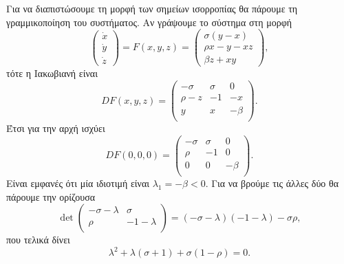 \begin{solution}
    Για να διαπιστώσουμε τη μορφή των σημείων ισορροπίας θα πάρουμε τη
    γραμμικοποίηση του συστήματος. Αν γράψουμε το σύστημα στη μορφή
    \begin{equation*}
        \begin{pmatrix}
            \dot{x} \\
            \dot{y} \\
            \dot{z}
        \end{pmatrix} = F(x, y, z) =
        \begin{pmatrix}
            \sigma(y - x) \\
            \rho x - y - xz \\
            \beta z + xy
        \end{pmatrix},
    \end{equation*}
    τότε η Ιακωβιανή είναι
    \begin{equation*}
        DF(x, y, z) =
        \begin{pmatrix}
            -\sigma & \sigma & 0 \\
            \rho - z & -1 & -x \\
            y & x & -\beta \\
        \end{pmatrix}.
    \end{equation*}
    Έτσι για την αρχή ισχύει
    \begin{equation*}
        DF(0, 0, 0) =
        \begin{pmatrix}
            -\sigma & \sigma & 0 \\
            \rho & -1 & 0 \\
            0 & 0 & -\beta \\
        \end{pmatrix}.
    \end{equation*}
    Είναι εμφανές ότι μία ιδιοτιμή είναι \( \lambda_1 = -\beta < 0\). Για να
    βρούμε τις άλλες δύο θα πάρουμε την ορίζουσα
    \begin{equation*}
        \det
        \begin{pmatrix}
            -\sigma - \lambda & \sigma \\
            \rho & -1 - \lambda \\
        \end{pmatrix}=
        (-\sigma - \lambda)(-1 - \lambda) - \sigma \rho,
    \end{equation*}
    που τελικά δίνει
    \begin{equation*}
        \lambda^2 + \lambda(\sigma + 1) + \sigma(1 - \rho) = 0.

\end{equation*}
\end{solution}
